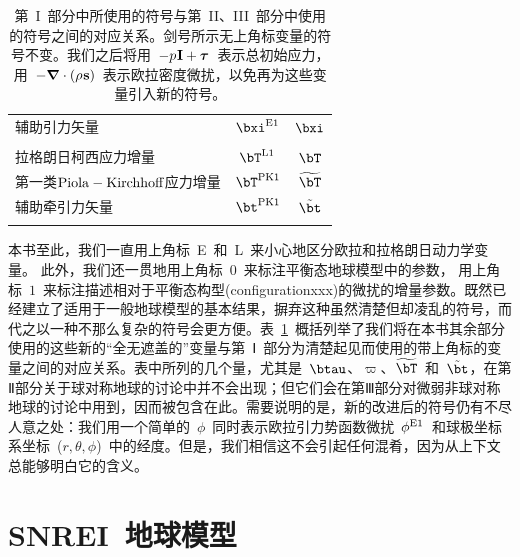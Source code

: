 \begin{table}
\begin{tabular}{|l|c|c|}
辅助引力矢量 & $\bxi^{\rm E1}$ & $\bxi$ \\
\index{gravity}%
& & \\
拉格朗日柯西应力增量 & $\bT^{\rm L1}$ & $\bT$ \\
\index{stress!Cauchy}%
\index{Cauchy stress}%
第一类$\rm Piola-Kirchhoff$应力增量 & $\bT^{\rm PK1}$ & $\widetilde{\bT}$ \\
\index{stress!first Piola-Kirchhoff}%
\index{Piola-Kirchhoff stress!first}%
辅助牵引力矢量 & $\bt^{\rm PK1}$ & $\tilde{\bt}$ \\
& & \\ \hline
\end{tabular}
\caption[newnotation]
{第~I~部分中所使用的符号与第~II、III~部分中使用的符号之间的对应关系。剑号所示无上角标变量的符号不变。我们之后将用~$-p\hspace{0.2 mm}{\bf I}+{\mbox{\boldmath $\bf \tau$}}$~表示总初始应力，用~$-{\mbox{\boldmath $\nabla$}}\cdot(\rho\hspace{0.2 mm}{\bf s})$~表示欧拉密度微扰，以免再为这些变量引入新的符号。}
\label{table:notation}
\end{table}

本书至此，我们一直用上角标~E~和~L~来小心地区分欧拉和拉格朗日动力学变量。
%
%
此外，我们还一贯地用上角标~$0$~来标注平衡态地球模型中的参数，
%
%
用上角标~$1$~来标注描述相对于平衡态构型(configurationxxx)的微扰的增量参数。既然已经建立了适用于一般地球模型的基本结果，摒弃这种虽然清楚但却凌乱的符号，而代之以一种不那么复杂的符号会更方便。表~\ref{table:notation}~概括列举了我们将在本书其余部分使用的这些新的“全无遮盖的”变量与第~Ⅰ~部分为清楚起见而使用的带上角标的变量之间的对应关系。表中所列的几个量，尤其是~$\btau$、$\varpi$、$\widetilde{\bT}$~和~$\tilde{\bt}$，在第Ⅱ部分关于球对称地球的讨论中并不会出现；但它们会在第Ⅲ部分对微弱非球对称地球的讨论中用到，因而被包含在此。需要说明的是，新的改进后的符号仍有不尽人意之处：我们用一个简单的~$\phi$~同时表示欧拉引力势函数微扰~$\phi^{\rm E1}$~和球极坐标系坐标~($r,\theta,\phi$)~中的经度。但是，我们相信这不会引起任何混肴，因为从上下文总能够明白它的含义。

\section{SNREI~地球模型}
%
%

